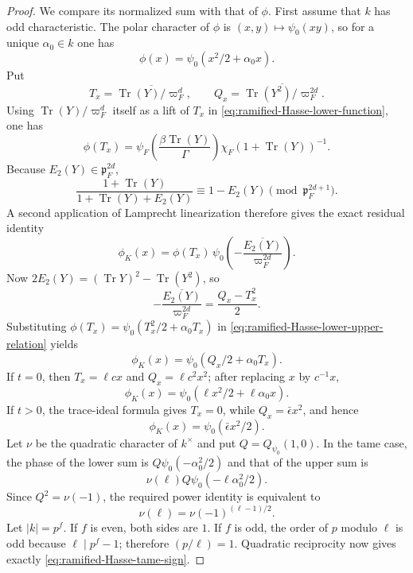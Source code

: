 \documentclass[11pt]{amsart}
\theoremstyle{definition}
\theoremstyle{remark}
\newcommand{\p}{\mathfrak p}
\newcommand{\Tr}{\operatorname{Tr}}
\begin{document}
\begin{proof}
We compare its normalized sum with that of $\phi$.  First assume that
$k$ has odd characteristic.  The polar character of $\phi$ is
$(x,y)\mapsto\psi_0(xy)$, so for a unique $\alpha_0\in k$ one has
\[
 \phi(x)=\psi_0(x^2/2+\alpha_0x).
\]
Put
\[
 T_x=\overline{\Tr(Y)/\varpi_F^d},
 \qquad
 Q_x=\overline{\Tr(Y^2)/\varpi_F^{2d}}.
\]
Using $\Tr(Y)/\varpi_F^d$ itself as a lift of $T_x$ in
\eqref{eq:ramified-Hasse-lower-function}, one has
\[
 \phi(T_x)=
 \psi_F\!\left(\frac{\beta\Tr(Y)}{\Gamma}\right)
 \chi_F(1+\Tr(Y))^{-1}.
\]
Because $E_2(Y)\in\p_F^{2d}$,
\[
 \frac{1+\Tr(Y)}{1+\Tr(Y)+E_2(Y)}
 \equiv1-E_2(Y)\pmod{\p_F^{2d+1}}.
\]
A second application of Lamprecht linearization therefore gives the
exact residual identity
\begin{equation}\label{eq:ramified-Hasse-lower-upper-relation}
 \phi_K(x)=
 \phi(T_x)\,
 \psi_0\!\left(
  -\overline{\frac{E_2(Y)}{\varpi_F^{2d}}}\right).
\end{equation}
Now
$2E_2(Y)=(\Tr Y)^2-\Tr(Y^2)$, so
\[
 -\overline{\frac{E_2(Y)}{\varpi_F^{2d}}}
 =\frac{Q_x-T_x^2}{2}.
\]
Substituting
$\phi(T_x)=\psi_0(T_x^2/2+\alpha_0T_x)$ in
\eqref{eq:ramified-Hasse-lower-upper-relation} yields
\begin{equation}\label{eq:ramified-Hasse-quadratic-form}
 \phi_K(x)=\psi_0(Q_x/2+\alpha_0T_x).
\end{equation}
If $t=0$, then $T_x=\ell cx$ and $Q_x=\ell c^2x^2$; after replacing
$x$ by $c^{-1}x$,
\begin{equation}\label{eq:ramified-Hasse-tame-form}
 \phi_K(x)=\psi_0(\ell x^2/2+\ell\alpha_0x).
\end{equation}
If $t>0$, the trace-ideal formula gives $T_x=0$, while
$Q_x=\bar\epsilon x^2$, and hence
\begin{equation}\label{eq:ramified-Hasse-wild-form}
 \phi_K(x)=\psi_0(\bar\epsilon x^2/2).
\end{equation}
Let $\nu$ be the quadratic character of $k^\times$ and put
$Q=Q_{\psi_0}(1,0)$.  In the tame case, the phase of the lower sum is
$Q\psi_0(-\alpha_0^2/2)$ and that of the upper sum is
\[
 \nu(\ell)Q\psi_0(-\ell\alpha_0^2/2).
\]
Since $Q^2=\nu(-1)$, the required power identity is equivalent to
\begin{equation}\label{eq:ramified-Hasse-tame-sign}
 \nu(\ell)=\nu(-1)^{(\ell-1)/2}.
\end{equation}
Let $|k|=p^f$.  If $f$ is even, both sides are $1$.  If $f$ is odd,
the order of $p$ modulo $\ell$ is odd because $\ell\mid p^f-1$;
therefore $(p/\ell)=1$.  Quadratic reciprocity now gives exactly
\eqref{eq:ramified-Hasse-tame-sign}.


\end{proof}
\end{document}
